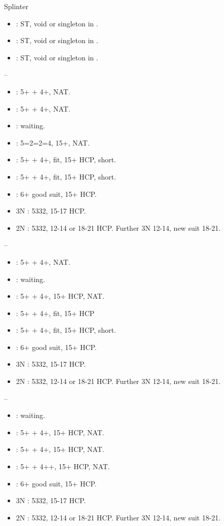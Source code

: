 \documentclass[12pt,twoside,a5paper]{report}%
\begin{document}
	Splinter
	\begin{itemize}
	\renewcommand{\labelitemi}{}
	\item {} : ST, void or singleton in \cl{}.
	\item {} : ST, void or singleton in \di{}.
	\item {} : ST, void or singleton in \he{}.
	\end{itemize}

	--
	\begin{itemize}
	\renewcommand{\labelitemi}{}
	\item {} : 5+\sp{} + 4+\di{}, NAT.
	\item {} : 5+\sp{} + 4+\he{}, NAT.
	\item {} : waiting.
	\item {} : 5=2=2=4, 15+, NAT.
	\item {} : 5+\sp{} + 4+\cl{}, fit, 15+ HCP, short\di{}.
	\item {} : 5+\sp{} + 4+\cl{}, fit, 15+ HCP, short\he{}.
	\item {} : 6+\sp{} good suit, 15+ HCP.
	\item 3N : 5332, 15-17 HCP.
	\item 2N : 5332, 12-14 or 18-21 HCP. Further 3N 12-14, new suit 18-21.
	\end{itemize}

	--
	\begin{itemize}
	\renewcommand{\labelitemi}{}
	\item {} : 5+\sp{} + 4+\he{}, NAT.
	\item {} : waiting.
	\item {} : 5+\he{} + 4+\cl{}, 15+ HCP, NAT.
	\item {} : 5+\sp{} + 4+\di{}, fit, 15+ HCP
	\item {} : 5+\sp{} + 4+\di{}, fit, 15+ HCP, short\he{}.
	\item {} : 6+\sp{} good suit, 15+ HCP.
	\item 3N : 5332, 15-17 HCP.
	\item 2N : 5332, 12-14 or 18-21 HCP. Further 3N 12-14, new suit 18-21.
	\end{itemize}

	--
	\begin{itemize}
	\renewcommand{\labelitemi}{}
	\item {} : waiting.
	\item {} : 5+\he{} + 4+\cl{}, 15+ HCP, NAT.
	\item {} : 5+\sp{} + 4+\di{}, 15+ HCP, NAT.
	\item {} : 5+\sp{} + 4+\he{}+, 15+ HCP, NAT.
	\item {} : 6+\sp{} good suit, 15+ HCP.
	\item 3N : 5332, 15-17 HCP.
	\item 2N : 5332, 12-14 or 18-21 HCP. Further 3N 12-14, new suit 18-21.
	\end{itemize}
\end{document}
